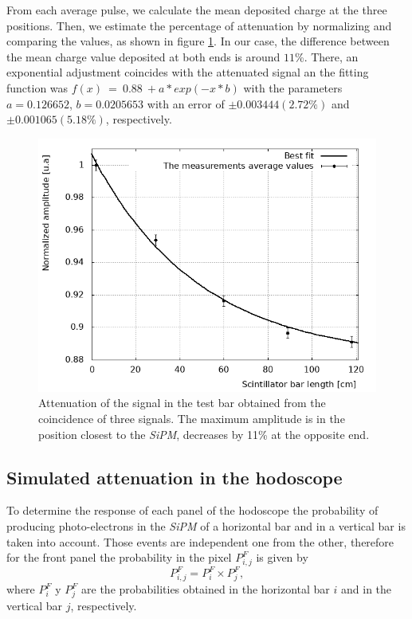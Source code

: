\documentclass[submitting]{nst}
\begin{document}
From each average pulse, we calculate the mean deposited charge at the three positions. Then, we estimate the percentage of attenuation by normalizing and comparing the values, as shown in figure \ref{experimental_attenuation}. In our case, the difference between the mean charge value deposited at both ends is around $11$\%.  There, an exponential adjustment coincides with the attenuated signal an the fitting function was 
$f(x)~=~0.88~+a*exp(-x*b)$ with the parameters $a=0.126652$, $b= 0.0205653$ with an error of  $\pm 0.003444 (2.72\%)$ and $\pm 0.001065 (5.18\%)$, respectively.
\begin{figure}[h!] %
    \centering
        \includegraphics[scale=0.49]{Figures/atenuacion_esperimental.png}
   \caption{Attenuation of the signal in the test bar obtained from the coincidence of three signals. The maximum amplitude is in the position closest to the \textsl{SiPM}, decreases by 11\% at the opposite end.} \label{experimental_attenuation}
\end{figure}

\subsection{Simulated attenuation in the hodoscope}
\label{sec:hodoscope-response-two} %
To determine the response of each panel of the hodoscope the probability of producing photo-electrons in the \textsl{SiPM} of a horizontal bar and in a vertical bar is taken into account. Those events are independent one from the other, therefore for the front panel the probability in the pixel $P^{F}_{i,j}$ is given by 
\begin{equation}
\label{pe_panel}
P^{F}_{i,j}=P^{F}_{i} \times P^{F}_{j},
\end{equation}
where $P^{F}_{i}$ y $P^{F}_j$ are the probabilities obtained in the horizontal bar $i$ and in the vertical bar $j$, respectively.
\end{document}
